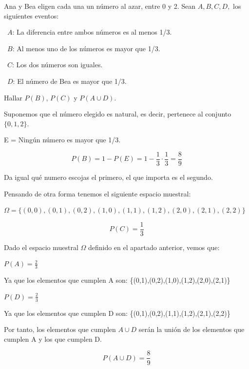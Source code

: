 
\begin{problem}[5] Ana y Bea eligen cada una un n\'umero al azar, entre 0 y 2. Sean $A, B, C, D,$ los siguientes
eventos: 

\  $A$: La diferencia entre ambos n\'umeros es al menos 1/3.

\ $B$:   Al menos uno de los n\'umeros es mayor que 1/3.

\ $C$: Los dos n\'umeros son iguales.

\ $D$: El n\'umero de Bea es mayor que 1/3.

Hallar $P(B)$, $P(C)$ y $P(A\cup D)$.
\solution

\begin{expla}
Suponemos que el número elegido es natural, es decir, pertenece al conjunto $\{0,1,2\}$.
\end{expla}

\spart
E = Ningún número es mayor que 1/3.

\[
P(B)=1 - P(E)= 1 - \frac{1}{3}\cdot\frac{1}{3} = \frac{8}{9}
\]

\spart

Da igual qué numero escojas el primero, el que importa es el segundo.

Pensando de otra forma tenemos el siguiente espacio muestral:

$\Omega=\{(0,0),(0,1),(0,2),(1,0),(1,1),(1,2),(2,0),(2,1),(2,2)\}$

\[
P(C)=\frac{1}{3}
\]

\spart
Dado el espacio muestral $\Omega$ definido en el apartado anterior, vemos que:

$P(A)=\frac{2}{3}$ 

Ya que los elementos que cumplen A son: \{(0,1),(0,2),(1,0),(1,2),(2,0),(2,1)\}

$P(D)=\frac{2}{3}$

Ya que los elementos que cumplen D son: \{(0,1),(0,2),(1,1),(1,2),(2,1),(2,2)\}

Por tanto, los elementos que cumplen $A\cup D$ serán la unión de los elementos que cumplen A y los que cumplen D.

\[
P(A \cup D) = \frac{8}{9}
\]

\end{problem}


